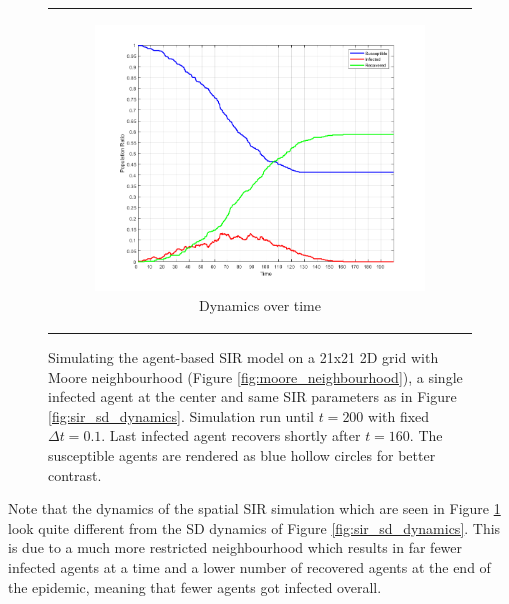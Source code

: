\begin{figure}
\begin{center}
\begin{tabular}{c}
		\begin{subfigure}[b]{0.38\textwidth}
			\centering
			\includegraphics[width=1\textwidth, angle=0]{./fig/step5_environment/SIR_dynamics_30x30agents_300t_01dt.png}
			\caption{Dynamics over time}
			\label{fig:sir_dynamics_30x30agents_300t_01dt}
		\end{subfigure}
	\end{tabular}
	
	\caption{Simulating the agent-based SIR model on a 21x21 2D grid with Moore neighbourhood (Figure \ref{fig:moore_neighbourhood}), a single infected agent at the center and same SIR parameters as in Figure \ref{fig:sir_sd_dynamics}. Simulation run until $t = 200$ with fixed $\Delta t = 0.1$. Last infected agent recovers shortly after $t = 160$. The susceptible agents are rendered as blue hollow circles for better contrast.}
	\label{fig:sir_env}
\end{center}
\end{figure}

Note that the dynamics of the spatial SIR simulation which are seen in Figure \ref{fig:sir_dynamics_30x30agents_300t_01dt} look quite different from the SD dynamics of Figure \ref{fig:sir_sd_dynamics}. This is due to a much more restricted neighbourhood which results in far fewer infected agents at a time and a lower number of recovered agents at the end of the epidemic, meaning that fewer agents got infected overall.

